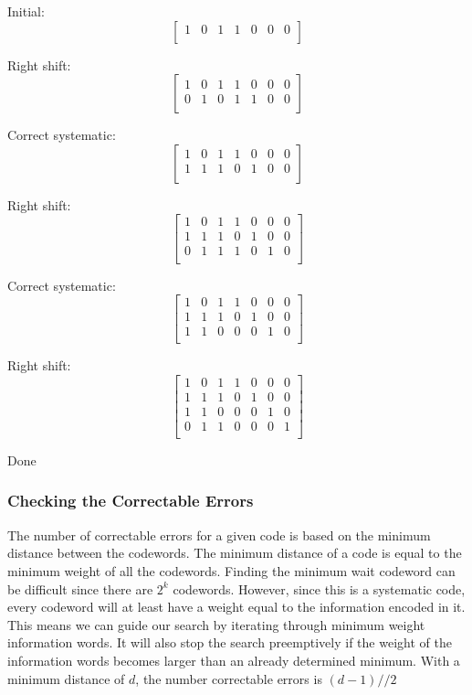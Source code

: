 \documentclass{article}
\begin{document}
\begin{flushleft}
Initial:
\[
\begin{bmatrix}
1 & 0 & 1 & 1 & 0 & 0 & 0 \\
\end{bmatrix}
\]

Right shift:
\[
\begin{bmatrix}
1 & 0 & 1 & 1 & 0 & 0 & 0 \\
0 & 1 & 0 & 1 & 1 & 0 & 0 \\
\end{bmatrix}
\]

Correct systematic:
\[
\begin{bmatrix}
1 & 0 & 1 & 1 & 0 & 0 & 0 \\
1 & 1 & 1 & 0 & 1 & 0 & 0 \\
\end{bmatrix}
\]

Right shift:
\[
\begin{bmatrix}
1 & 0 & 1 & 1 & 0 & 0 & 0 \\
1 & 1 & 1 & 0 & 1 & 0 & 0 \\
0 & 1 & 1 & 1 & 0 & 1 & 0 \\
\end{bmatrix}
\]

Correct systematic:
\[
\begin{bmatrix}
1 & 0 & 1 & 1 & 0 & 0 & 0 \\
1 & 1 & 1 & 0 & 1 & 0 & 0 \\
1 & 1 & 0 & 0 & 0 & 1 & 0 \\
\end{bmatrix}
\]

Right shift:
\[
\begin{bmatrix}
1 & 0 & 1 & 1 & 0 & 0 & 0 \\
1 & 1 & 1 & 0 & 1 & 0 & 0 \\
1 & 1 & 0 & 0 & 0 & 1 & 0 \\
0 & 1 & 1 & 0 & 0 & 0 & 1 \\
\end{bmatrix}
\]

Done
\end{flushleft}

\subsubsection{Checking the Correctable Errors}
The number of correctable errors for a given code is based on the minimum distance between the codewords. The minimum distance of a code is equal to the minimum weight of all the codewords.
Finding the minimum wait codeword can be difficult since there are $2^k$ codewords. However, since this is a systematic code, every codeword will at least have a weight equal to the information encoded in it. This means we can guide our search by iterating through minimum weight information words. It will also stop the search preemptively if the weight of the information words becomes larger than an already determined minimum. With a minimum distance of $d$, the number correctable errors is $(d-1)//2$ 
\end{document}
